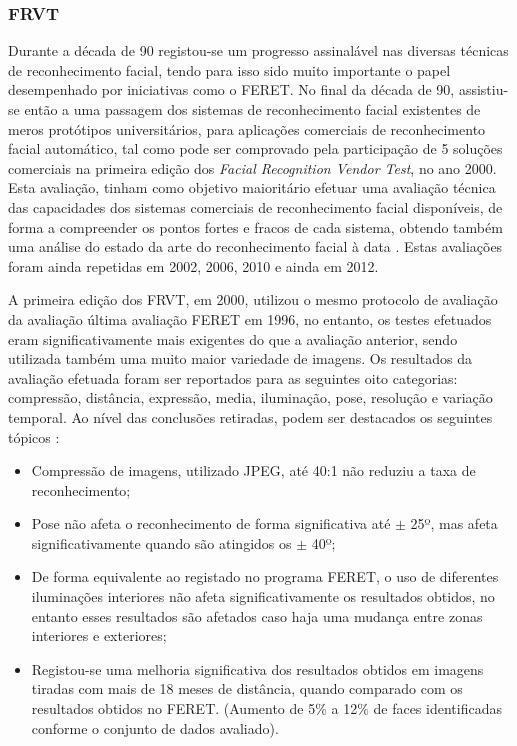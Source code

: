 \subsubsection{FRVT}
Durante a década de 90 registou-se um progresso assinalável nas diversas técnicas de reconhecimento facial, tendo para isso sido muito importante o papel desempenhado por iniciativas como o FERET. No final da década de 90, assistiu-se então a uma passagem dos sistemas de reconhecimento facial existentes de meros protótipos universitários, para aplicações comerciais de reconhecimento facial automático, tal como pode ser comprovado  pela participação de 5 soluções comerciais na primeira edição dos \textit{Facial Recognition Vendor Test}, no ano 2000. Esta avaliação, tinham como objetivo maioritário efetuar uma avaliação técnica das capacidades dos sistemas comerciais de reconhecimento facial disponíveis, de forma a compreender os pontos fortes e fracos de cada sistema, obtendo também uma análise do estado da arte do reconhecimento facial à data \cite{BlackburnDuaneM.;BoneMike;Phillips2001}. Estas avaliações foram ainda repetidas em 2002, 2006, 2010 e ainda em 2012.

A primeira edição dos FRVT, em 2000, utilizou o mesmo protocolo de avaliação da avaliação última avaliação FERET em 1996, no entanto, os testes efetuados eram significativamente mais exigentes do que a avaliação anterior, sendo utilizada também uma muito maior variedade de imagens. Os resultados da avaliação efetuada foram ser reportados para as seguintes oito categorias: compressão, distância, expressão,  media, iluminação, pose, resolução e variação temporal. Ao nível das conclusões retiradas, podem ser destacados os seguintes tópicos \cite{BlackburnDuaneM.;BoneMike;Phillips2001, Chellappa2010, Li2011}:
\begin{itemize}
\item Compressão de imagens, utilizado JPEG, até 40:1 não reduziu a taxa de reconhecimento;
\item Pose não afeta o reconhecimento de forma significativa até $\pm$ 25º, mas afeta significativamente quando são atingidos os $\pm$ 40º;
\item De forma equivalente ao registado no programa FERET, o uso de diferentes iluminações interiores não afeta significativamente os resultados obtidos, no entanto esses resultados são afetados caso haja uma mudança entre zonas interiores e exteriores;
\item Registou-se uma melhoria significativa dos resultados obtidos em imagens tiradas com mais de 18 meses de distância, quando comparado com os resultados obtidos no FERET. (Aumento de 5\% a 12\% de faces identificadas conforme o conjunto de dados avaliado).
\end{itemize}

